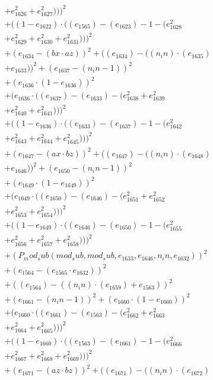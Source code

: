 \documentclass[10pt, a4paper]{article}
\begin{document}
\begin{align*}
& + e_{1626}^{2} + e_{1627}^{2})))^{2} \\
& + ((1 - e_{1622})  \cdot  ((e_{1565}) - (e_{1623}) - 1 - (e_{1628}^{2} \\
& + e_{1629}^{2} + e_{1630}^{2} + e_{1631}^{2})))^{2} \\
& + (e_{1634} - (bx  \cdot  az))^{2} + ((e_{1634}) - ((n_in)  \cdot  (e_{1635}) \\
& + e_{1633}))^{2} + (e_{1637} - (n_in - 1))^{2} \\
& + (e_{1636}  \cdot  (1 - e_{1636}))^{2} \\
& + (e_{1636}  \cdot  ((e_{1637}) - (e_{1633}) - (e_{1638}^{2} + e_{1639}^{2} \\
& + e_{1640}^{2} + e_{1641}^{2})))^{2} \\
& + ((1 - e_{1636})  \cdot  ((e_{1633}) - (e_{1637}) - 1 - (e_{1642}^{2} \\
& + e_{1643}^{2} + e_{1644}^{2} + e_{1645}^{2})))^{2} \\
& + (e_{1647} - (ax  \cdot  bz))^{2} + ((e_{1647}) - ((n_in)  \cdot  (e_{1648}) \\
& + e_{1646}))^{2} + (e_{1650} - (n_in - 1))^{2} \\
& + (e_{1649}  \cdot  (1 - e_{1649}))^{2} \\
& + (e_{1649}  \cdot  ((e_{1650}) - (e_{1646}) - (e_{1651}^{2} + e_{1652}^{2} \\
& + e_{1653}^{2} + e_{1654}^{2})))^{2} \\
& + ((1 - e_{1649})  \cdot  ((e_{1646}) - (e_{1650}) - 1 - (e_{1655}^{2} \\
& + e_{1656}^{2} + e_{1657}^{2} + e_{1658}^{2})))^{2} \\
& + (P_mod_sub(mod_sub, mod_sub, e_{1633}, e_{1646}, n_in, e_{1632}))^{2} \\
& + (e_{1564} - (e_{1565}  \cdot  e_{1632}))^{2} \\
& + ((e_{1564}) - ((n_in)  \cdot  (e_{1659}) + e_{1563}))^{2} \\
& + (e_{1661} - (n_in - 1))^{2} + (e_{1660}  \cdot  (1 - e_{1660}))^{2} \\
& + (e_{1660}  \cdot  ((e_{1661}) - (e_{1563}) - (e_{1662}^{2} + e_{1663}^{2} \\
& + e_{1664}^{2} + e_{1665}^{2})))^{2} \\
& + ((1 - e_{1660})  \cdot  ((e_{1563}) - (e_{1661}) - 1 - (e_{1666}^{2} \\
& + e_{1667}^{2} + e_{1668}^{2} + e_{1669}^{2})))^{2} \\
& + (e_{1671} - (az  \cdot  bz))^{2} + ((e_{1671}) - ((n_in)  \cdot  (e_{1672}) \\

\end{align*}
\end{document}
